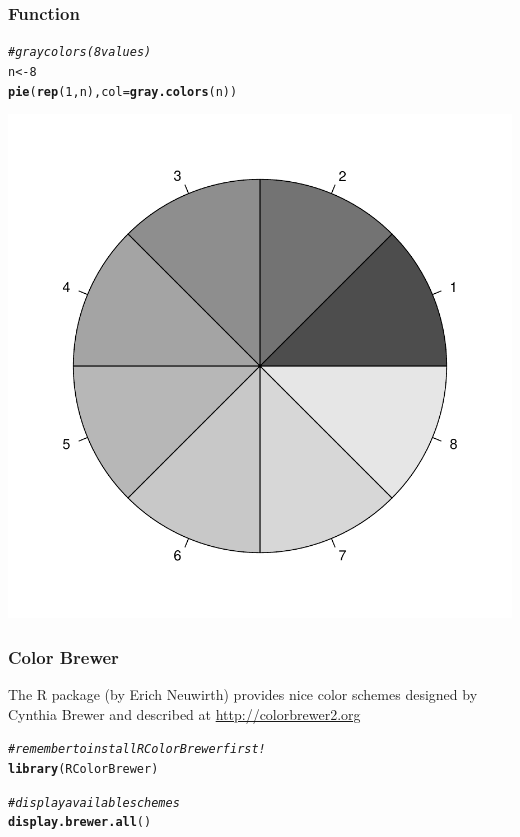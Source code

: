 \documentclass[12pt]{beamer}\usepackage[]{graphicx}\usepackage[]{color}
\makeatletter
\newcommand{\hlnum}[1]{\textcolor[rgb]{0.686,0.059,0.569}{#1}}%
\newcommand{\hlcom}[1]{\textcolor[rgb]{0.678,0.584,0.686}{\textit{#1}}}%
\newcommand{\hlstd}[1]{\textcolor[rgb]{0.345,0.345,0.345}{#1}}%
\newcommand{\hlkwb}[1]{\textcolor[rgb]{0.69,0.353,0.396}{#1}}%
\newcommand{\hlkwc}[1]{\textcolor[rgb]{0.333,0.667,0.333}{#1}}%
\newcommand{\hlkwd}[1]{\textcolor[rgb]{0.737,0.353,0.396}{\textbf{#1}}}%
\newenvironment{kframe}{%
 \def\at@end@of@kframe{}%
 \ifinner\ifhmode%
  \def\at@end@of@kframe{\end{minipage}}%
  \begin{minipage}{\columnwidth}%
 \fi\fi%
 \def\FrameCommand##1{\hskip\@totalleftmargin \hskip-\fboxsep
 \colorbox{shadecolor}{##1}\hskip-\fboxsep
     \hskip-\linewidth \hskip-\@totalleftmargin \hskip\columnwidth}%
 \MakeFramed {\advance\hsize-\width
   \@totalleftmargin\z@ \linewidth\hsize
   \@setminipage}}%
 {\par\unskip\endMakeFramed%
 \at@end@of@kframe}
\newenvironment{knitrout}{}{} %
\makeatother
\begin{document}
\begin{frame}[fragile]
\frametitle{Function }

\begin{knitrout}\scriptsize
{}\color{fgcolor}\begin{kframe}
\begin{alltt}
\hlcom{# gray colors (8 values)}
\hlstd{n} \hlkwb{<-} \hlnum{8}
\hlkwd{pie}\hlstd{(}\hlkwd{rep}\hlstd{(}\hlnum{1}\hlstd{, n),} \hlkwc{col} \hlstd{=} \hlkwd{gray.colors}\hlstd{(n))}
\end{alltt}
\end{kframe}

{\centering \includegraphics[width=.4\linewidth,height=.4\linewidth]{figure/garycolors-1} 

}



\end{knitrout}

\end{frame}


\begin{frame}[fragile]
\begin{center}
\end{center}
\end{frame}


\begin{frame}[fragile]
\frametitle{Color Brewer}

The R package  (by Erich Neuwirth) provides nice color schemes designed by Cynthia Brewer and described at \url{http://colorbrewer2.org}

\begin{knitrout}\footnotesize
{}\color{fgcolor}\begin{kframe}
\begin{alltt}
\hlcom{# remember to install RColorBrewer first!}
\hlkwd{library}\hlstd{(RColorBrewer)}

\hlcom{# display available schemes }
\hlkwd{display.brewer.all}\hlstd{()}
\end{alltt}
\end{kframe}
\end{knitrout}

\end{frame}
\end{document}
